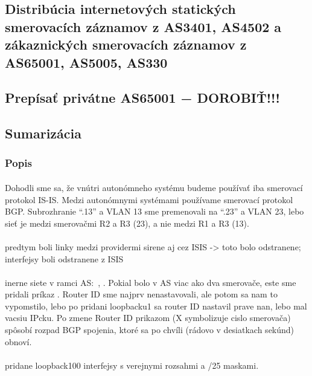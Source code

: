 \documentclass[12pt,twoside,a4paper]{report}
\begin{document}
\subsection{Distribúcia internetových statických smerovacích záznamov z AS3401, AS4502 a zákaznických smerovacích záznamov z AS65001, AS5005, AS330}
\subsection{Prepísať privátne AS65001 − DOROBIŤ!!!}
\subsection{Sumarizácia}


\subsubsection{Popis}
\paragraph{}
Dohodli sme sa, že vnútri autonómneho systému budeme používať iba smerovací protokol IS-IS. Medzi autonómnymi systémami používame smerovací protokol BGP. Subrozhranie “.13” a VLAN 13 sme premenovali na “.23” a VLAN 23, lebo sieť je medzi smerovačmi R2 a R3 (23), a nie medzi R1 a R3 (13).

\paragraph{}
predtym boli linky medzi providermi sirene aj cez ISIS -> toto bolo odstranene; interfejsy boli odstranene z ISIS

\paragraph{}
inerne siete v ramci AS: , . Pokial bolo v AS viac ako dva smerovače, este sme pridali príkaz . Router ID sme najprv nenastavovali, ale potom sa nam to vypomstilo, lebo po pridani loopbacku1 sa router ID nastavil prave nan, lebo mal vacsiu IPcku. Po zmene Router ID prikazom  (X symbolizuje cislo smerovača) spôsobí rozpad BGP spojenia, ktoré sa po chvíli (rádovo v desiatkach sekúnd) obnoví.

\paragraph{}
pridane loopback100 interfejsy s verejnymi rozsahmi a /25 maskami.
\end{document}
